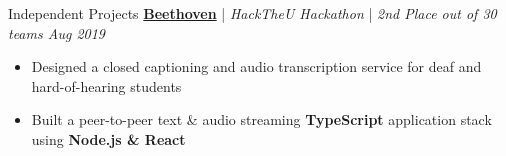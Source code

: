 \documentclass{resume/resume}
\begin{document}
\begin{rSection}{Independent Projects}
  \href{https://devpost.com/software/beethoven-t9ud86}{\bf Beethoven} | {\em HackTheU Hackathon } | {\em 2nd Place out of 30 teams
  \hfill Aug 2019}
  \vspace{-6pt}
  \begin{itemize}[nosep]
    \item Designed a closed captioning and audio transcription service for deaf and hard-of-hearing students
    \item Built a peer-to-peer text \& audio streaming {\bf TypeScript} application stack using {\bf Node.js \& React}
  \end{itemize}

  
  

\end{rSection}
\end{document}
